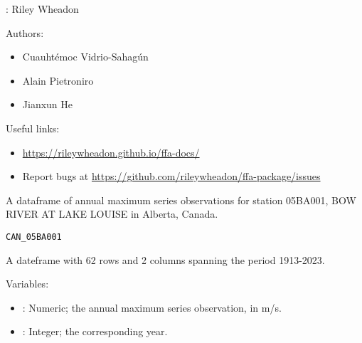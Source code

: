 \documentclass[a4paper]{book}
\begin{document}
%
\begin{Author}
: Riley Wheadon 

Authors:
\begin{itemize}

\item{} Cuauhtémoc Vidrio-Sahagún 
\item{} Alain Pietroniro 
\item{} Jianxun He 

\end{itemize}


\end{Author}
%
\begin{SeeAlso}
Useful links:
\begin{itemize}

\item{} \url{https://rileywheadon.github.io/ffa-docs/}
\item{} Report bugs at \url{https://github.com/rileywheadon/ffa-package/issues}

\end{itemize}


\end{SeeAlso}
%
\begin{Description}
A dataframe of annual maximum series observations for
station 05BA001, BOW RIVER AT LAKE LOUISE in Alberta, Canada.
\end{Description}
%
\begin{Usage}
\begin{verbatim}
CAN_05BA001
\end{verbatim}
\end{Usage}
%
\begin{Format}
A dateframe with 62 rows and 2 columns spanning the period 1913-2023.
\end{Format}
%
\begin{Details}
Variables:
\begin{itemize}

\item{} : Numeric; the annual maximum series observation, in m/s.
\item{} : Integer; the corresponding year.

\end{itemize}

\end{Details}
\end{document}
